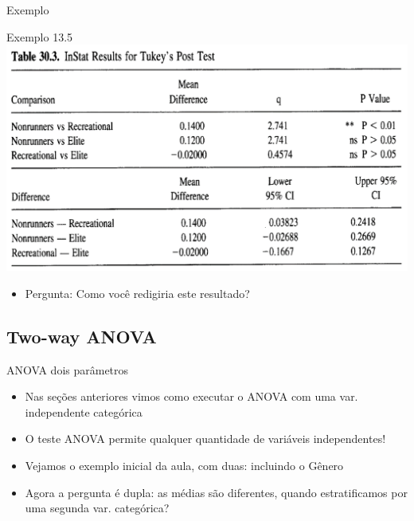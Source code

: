 \documentclass{beamer}
\begin{document}
\begin{frame}{Exemplo}
  \begin{exampleblock}{Exemplo 13.5}
    \includegraphics[width=\textwidth]{Cap13-30/exemplo13_5-4}
    \begin{itemize}
    \item Pergunta: Como você redigiria este resultado?
    \end{itemize}
  \end{exampleblock}
\end{frame}

\subsection{Two-way ANOVA}

\begin{frame}{ANOVA dois parâmetros}
  \begin{itemize}
  \item Nas seções anteriores vimos como executar o ANOVA com uma var. independente categórica
  \item O teste ANOVA permite qualquer quantidade de variáveis independentes!
  \item Vejamos o exemplo inicial da aula, com duas: incluindo o Gênero
  \item Agora a pergunta é dupla: as médias são diferentes, quando estratificamos por uma segunda var. categórica?
  \end{itemize}
\end{frame}
\end{document}

